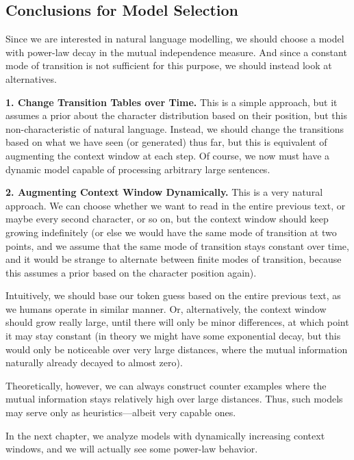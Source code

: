 \documentclass[../../main.tex]{subfiles}
\begin{document}
    \smallskip
\subsection{Conclusions for Model Selection}
    Since we are interested in natural language modelling, we should choose a model with power-law decay in the mutual independence measure. And since a constant mode of transition is not sufficient for this purpose, we should instead look at alternatives.

    \textbf{1. Change Transition Tables over Time.} This is a simple approach, but it assumes a prior about the character distribution based on their position, but this non-characteristic of natural language. Instead, we should change the transitions based on what we have seen (or generated) thus far, but this is equivalent of augmenting the context window at each step. Of course, we now must have a dynamic model capable of processing arbitrary large sentences.

    \textbf{2. Augmenting Context Window Dynamically.} This is a very natural approach. We can choose whether we want to read in the entire previous text, or maybe every second character, or so on, but the context window should keep growing indefinitely (or else we would have the same mode of transition at two points, and we assume that the same mode of transition stays constant over time, and it would be strange to alternate between finite modes of transition, because this assumes a prior based on the character position again).
    
    Intuitively, we should base our token guess based on the entire previous text, as we humans operate in similar manner. Or, alternatively, the context window should grow really large, until there will only be minor differences, at which point it may stay constant (in theory we might have some exponential decay, but this would only be noticeable over very large distances, where the mutual information naturally already decayed to almost zero).

    Theoretically, however, we can always construct counter examples where the mutual information stays relatively high over large distances. Thus, such models may serve only as heuristics—albeit very capable ones.

    In the next chapter, we analyze models with dynamically increasing context windows, and we will actually see some power-law behavior.
\end{document}
